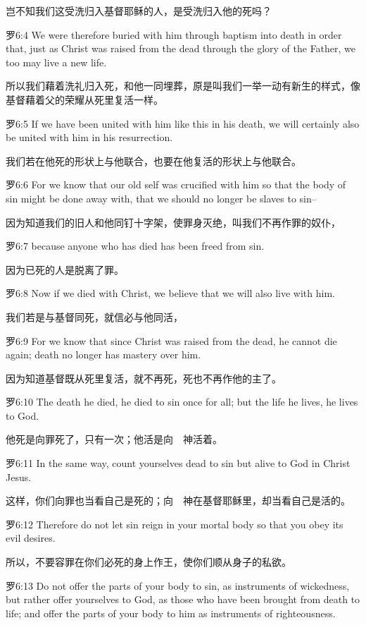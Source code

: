 \documentclass[a4paper,11pt,onecolumn,twoside]{ctexart}
\begin{document}
\begin{multicols}{2}
 岂不知我们这受洗归入基督耶稣的人，是受洗归入他的死吗？


 罗6:4
 We were therefore buried with him through baptism into death in order that, just as Christ was raised from the dead through the glory of the Father, we too may live a new life.

 所以我们藉着洗礼归入死，和他一同埋葬，原是叫我们一举一动有新生的样式，像基督藉着父的荣耀从死里复活一样。


 罗6:5
 If we have been united with him like this in his death, we will certainly also be united with him in his resurrection.

 我们若在他死的形状上与他联合，也要在他复活的形状上与他联合。


 罗6:6
 For we know that our old self was crucified with him so that the body of sin might be done away with, that we should no longer be slaves to sin--

 因为知道我们的旧人和他同钉十字架，使罪身灭绝，叫我们不再作罪的奴仆，


 罗6:7
 because anyone who has died has been freed from sin.

 因为已死的人是脱离了罪。


 罗6:8
 Now if we died with Christ, we believe that we will also live with him.

 我们若是与基督同死，就信必与他同活，


 罗6:9
 For we know that since Christ was raised from the dead, he cannot die again; death no longer has mastery over him.

 因为知道基督既从死里复活，就不再死，死也不再作他的主了。


 罗6:10
 The death he died, he died to sin once for all; but the life he lives, he lives to God.

 他死是向罪死了，只有一次；他活是向　神活着。


 罗6:11
 In the same way, count yourselves dead to sin but alive to God in Christ Jesus.

 这样，你们向罪也当看自己是死的；向　神在基督耶稣里，却当看自己是活的。


 罗6:12
 Therefore do not let sin reign in your mortal body so that you obey its evil desires.

 所以，不要容罪在你们必死的身上作王，使你们顺从身子的私欲。


 罗6:13
 Do not offer the parts of your body to sin, as instruments of wickedness, but rather offer yourselves to God, as those who have been brought from death to life; and offer the parts of your body to him as instruments of righteousness.


\end{multicols}
\end{document}
